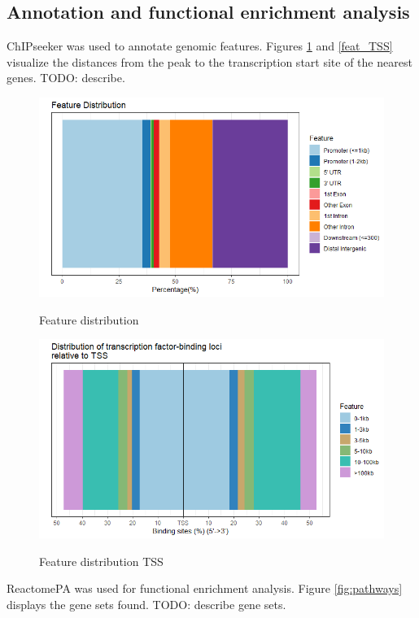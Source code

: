 \documentclass{article}
\begin{document}
\subsection{Annotation and functional enrichment analysis}
ChIPseeker\cite{yu2015chipseeker} was used to annotate genomic features. Figures \ref{fig:feat_dist} and \ref{feat_TSS} visualize the distances from the peak to the transcription start site of the nearest genes. TODO: describe.

\begin{figure}[h]
\caption{Feature distribution}
\centering
\includegraphics{feature_distribution.png}
\label{fig:feat_dist}
\end{figure}

\begin{figure}[h]
\caption{Feature distribution TSS}
\centering
\includegraphics{feature_distribution_TSS.png}
\label{fig:feat_TSS}
\end{figure}

ReactomePA\cite{yu2016reactomepa} was used for functional enrichment analysis. Figure \ref{fig:pathways} displays the gene sets found. TODO: describe gene sets.
\end{document}
